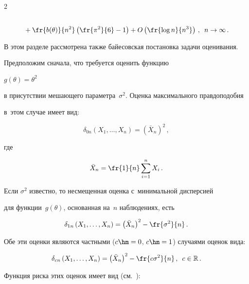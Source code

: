\begin{multicols}{2}
\begin{multline*}
\\


{}+ \fr{b(\theta)}{n^2} \left(\fr{\pi^2}{6} - 1\right) + O


\left(\fr{\log n}{n^3}\right)\,,\enskip n \to \infty\,.


\end{multline*}





В этом разделе рассмотрена также байесовская постановка задачи оценивания. 


Предположим сначала, что требуется оценить функцию


$


g(\theta) = \theta^2


$


в присутствии мешающего параметра~$\sigma^2$. Оценка максимального правдоподобия 


в~этом случае имеет вид:


$$


\delta_{0n}\left(X_1,\ldots,X_n\right) = \left(\bar X_n\right)^2\,,


$$


где


$$


\bar X_n = \fr{1}{n} \sum\limits_{i=1}^n X_i\,.


$$


Если $\sigma^2$ известно, то несмещенная оценка с~минимальной дисперсией 


для функции~$g(\theta)$, основанная на~$n$ наблюдениях, есть


$$


\delta_{1n}\left(X_1,\ldots,X_n\right) = \left(\bar X_n\right)^2 -\fr{\sigma^2}{n}\,.


$$


Обе эти оценки являются частными ($c\hm = 0$, $c\hm = 1$) случаями оценок вида:


\begin{equation}


\delta_{cn}\left(X_1,\ldots,X_n\right) = 


\left(\bar X_n\right)^2 - \fr{c \sigma^2}{n}\,,\enskip


c \in \mathbb{R}\,.


\label{e2.1}


\end{equation}


Функция риска этих оценок имеет вид (см.~\cite[с.~302]{4-ben}):



\end{multicols}
